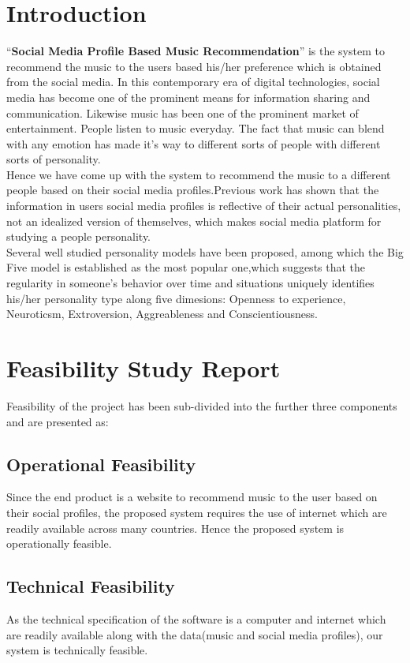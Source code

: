 \documentclass[a4paper,12pt]{article}
\begin{document}
\section{Introduction}
	``\textbf{Social Media Profile Based Music Recommendation}'' is the system to recommend the music to the users based his/her preference which is obtained from the social media. In this contemporary era of digital technologies, social media has become one of the prominent means for information sharing and communication. Likewise music has been one of the prominent market of entertainment. People listen to music everyday. The fact that music can blend with any emotion has made it's way to different sorts of people with different sorts of personality.\\
	Hence we have come up with the system to recommend the music to a different people based on their social media profiles.Previous work has shown that the information in users social media profiles is reflective of their actual personalities, not an idealized version of themselves, which makes social media platform for studying a people personality.\\
	Several well studied personality models have been proposed, among which the Big Five model is established as the most popular one,which suggests that the regularity in someone's behavior over time and situations uniquely identifies his/her personality type along five dimesions: Openness to experience, Neuroticsm, Extroversion, Aggreableness and Conscientiousness.
\cleardoublepage

\section{Feasibility Study Report}
	Feasibility of the project has been sub-divided into the further three components and are presented as:\\
	\subsection{Operational Feasibility}
	Since the end product is a website to recommend music to the user based on their social profiles, the proposed system requires the use of internet which are readily available across many countries. Hence the proposed system is operationally feasible.
	\subsection{Technical Feasibility}
	As the technical specification of the software is a computer and internet which are readily available along with the data(music and social media profiles), our system is technically feasible.
\end{document}
